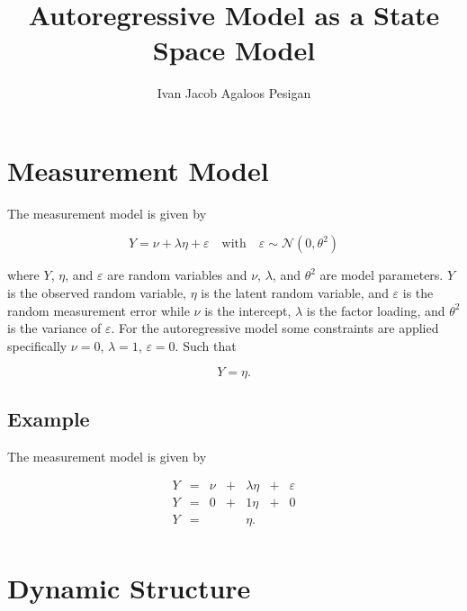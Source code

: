 \documentclass{article}
\title{Autoregressive Model as a State Space Model}
\author{Ivan Jacob Agaloos Pesigan}
\date{}
\begin{document}
\maketitle

\section{Measurement Model}

The measurement model is given by

\begin{equation}
    Y
    =
    \nu
    +
    \lambda
    \eta
    +
    \varepsilon
    \quad
    \mathrm{with}
    \quad
    \varepsilon
    \sim
    \mathcal{N}
    \left(
    0,
    \theta^{2}
    \right)
\end{equation}

\noindent where $Y$, $\eta$, and $\varepsilon$ are random variables and $\nu$, $\lambda$, and $\theta^{2}$ are model parameters. $Y$ is the observed random variable, $\eta$ is the latent random variable,
and $\varepsilon$ is the random measurement error while $\nu$ is the intercept, $\lambda$ is the factor loading, and $\theta^{2}$ is the variance of $\varepsilon$. For the autoregressive model some constraints are applied specifically $\nu = 0$, $\lambda = 1$,
$\varepsilon = 0$. Such that 

\begin{equation}
    Y = \eta .
\end{equation}

\subsection{Example}

The measurement model is given by

\begin{equation}
    \begin{array}{ccccccc}
         Y & = & \nu & + & \lambda \eta & + & \varepsilon \\
    Y
    & = &
    0
    & + &
    1
    \eta
    & + &
    0 \\
    Y
    & = &
    &   &
    \eta .
    &   &
    \\
    \end{array}
\end{equation}

\section{Dynamic Structure}
\end{document}
